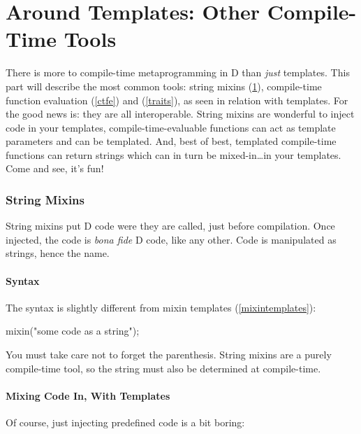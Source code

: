 \newpage %
\part{Around Templates: Other Compile-Time Tools}\label{around}

There is more to compile-time metaprogramming in D than \emph{just} templates. This part will describe the most common tools: string mixins (\ref{stringmixins}), compile-time function evaluation (\ref{ctfe}) and  (\ref{traits}), as seen in relation with templates. For the good news is: they are all interoperable. String mixins are wonderful to inject code in your templates, compile-time-evaluable functions can act as template parameters and can be templated. And, best of best, templated compile-time functions can return strings which can in turn be mixed-in\ldots in your templates. Come and see, it's fun!

\section{String Mixins} \label{stringmixins}

String mixins put D code were they are called, just before compilation. Once injected, the code is \emph{bona fide} D code, like any other. Code is manipulated as strings, hence the name.

\subsection{Syntax}\label{stringmixinssyntax}

The syntax is slightly different from mixin templates (\ref{mixintemplates}):

\begin{dcode}
mixin("some code as a string");
\end{dcode}

You must take care not to forget the parenthesis. String mixins are a purely compile-time tool, so the string must also be determined at compile-time.

\subsection{Mixing Code In, With Templates}\label{stringmixinsandtemplates}

Of course, just injecting predefined code is a bit boring:


